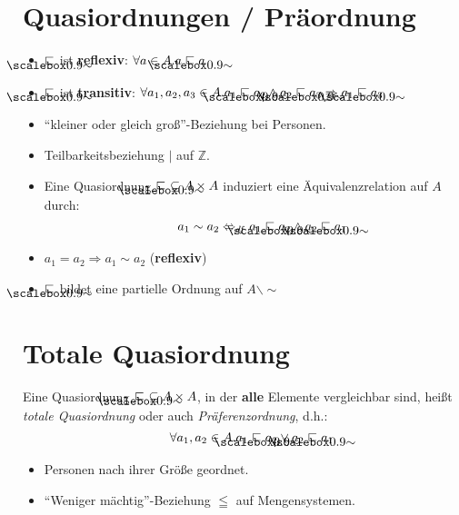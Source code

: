 \documentclass{article}
\begin{document}
\section*{Quasiordnungen / Präordnung}
\begin{defBox}[5.2]
	\begin{itemize}[label=]
		\item $\sqsubsetsim$ ist \textbf{reflexiv}: {\color{colCornYellow} $\forall a \in A. a \sqsubsetsim a$}
		\item $\sqsubsetsim$ ist \textbf{transitiv}: {\color{colCornYellow} $\forall a_1, a_2, a_3 \in A. a_1 \sqsubsetsim a_2 \land a_2 \sqsubsetsim a_3 \Rightarrow a_1 \sqsubsetsim a_3$}
	\end{itemize}
\end{defBox}
\begin{exampleBox}
	\begin{itemize}[label=]
		\item ``kleiner oder gleich groß''-Beziehung bei Personen.
		\item Teilbarkeitsbeziehung $|$ auf $\mathbb{Z}$.
	\end{itemize}
\end{exampleBox}
\begin{noteBox}
	\begin{itemize}[label=]
		\item Eine Quasiordnung $\sqsubsetsim\ \subseteq A \times A$ induziert eine Äquivalenzrelation auf $A$ durch:
		      \[
			      a_1 \sim a_2 \Leftrightarrow_{df} a_1 \sqsubsetsim a_2 \land a_2 \sqsubsetsim a_1
		      \]
		\item $a_1 = a_2 \Rightarrow a_1 \sim a_2$ (\textbf{reflexiv})
		\item $\sqsubsetsim$ bildet eine partielle Ordnung auf $A \backslash \sim$
	\end{itemize}
\end{noteBox}

\section*{Totale Quasiordnung}
\begin{defBox}
	Eine Quasiordnung $\sqsubsetsim\ \subseteq A \times A$,
	in der \textbf{alle} Elemente vergleichbar sind,
	heißt \textit{totale Quasiordnung} oder auch \textit{Präferenzordnung}, d.h.:
	\[
		\forall a_1, a_2 \in A. a_1 \sqsubsetsim a_2 \lor a_2 \sqsubsetsim a_1
	\]
\end{defBox}
\begin{exampleBox}
	\begin{itemize}[label=]
		\item Personen nach ihrer Größe geordnet.
		\item ``Weniger mächtig''-Beziehung $\leqq$ auf Mengensystemen.
	\end{itemize}
\end{exampleBox}
\end{document}
